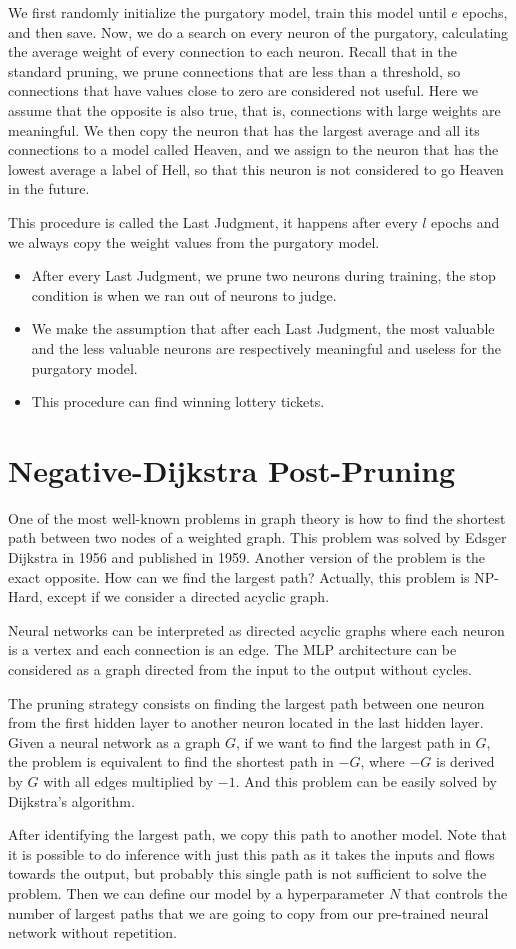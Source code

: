 \documentclass[abstract=true]{scrartcl}
\begin{document}
We first randomly initialize the purgatory model, train this model until $e$ epochs, and then save.
Now, we do a search on every neuron of the purgatory, calculating the average weight of every connection to each neuron.
Recall that in the standard pruning, we prune connections that are less than a threshold, so connections that have values close to zero
are considered not useful. Here we assume that the opposite is also true, that is, connections with large weights are meaningful. We then 
copy the neuron that has the largest average and all its connections to a model called Heaven, and we assign to the neuron that has the lowest average
a label of Hell, so that this neuron is not considered to go Heaven in the future.

This procedure is called the Last Judgment, it happens after every $l$ epochs and we always copy the weight values from 
the purgatory model. 

\begin{itemize}
    \item After every Last Judgment, we prune two neurons during training, the stop condition is when we ran out of neurons to judge.
    \item We make the assumption that after each Last Judgment, the most valuable and the less valuable neurons are respectively meaningful and useless for the purgatory model.
    \item This procedure can find winning lottery tickets.
\end{itemize}

\section{Negative-Dijkstra Post-Pruning}
One of the most well-known problems in graph theory is how to find the shortest path 
between two nodes of a weighted graph. This problem was solved by Edsger Dijkstra in 1956 and published in 1959.
Another version of the problem is the exact opposite. How can we find the largest path? Actually, this problem is 
NP-Hard, except if we consider a directed acyclic graph.

Neural networks can be interpreted as directed acyclic graphs where each neuron is a vertex
and each connection is an edge. The MLP architecture can be considered as a graph directed from the input
to the output without cycles.

The pruning strategy consists on finding the largest path between one neuron from the first hidden layer to another neuron
located in the last hidden layer. Given a neural network as a graph $G$, if we want to find the
largest path in $G$, the problem is equivalent to find the shortest path in $-G$, where $-G$ is derived by $G$ with all edges
multiplied by $-1$. And this problem can be easily solved by Dijkstra's algorithm.

After identifying the largest path, we copy this path to another model. Note that it is possible to do inference with just this path
as it takes the inputs and flows towards the output, but probably this single path is not sufficient to solve the problem.
Then we can define our model by a hyperparameter $N$ that controls the number of largest paths that we are going to copy from 
our pre-trained neural network without repetition.
\end{document}
